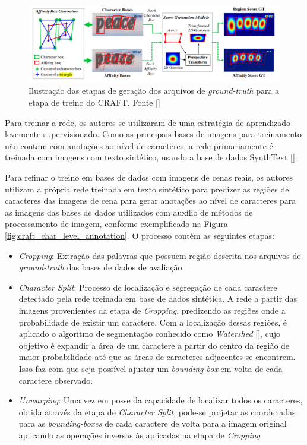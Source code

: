 \begin{figure}
    \centering
    \includegraphics[width=\textwidth]{figs/craft-gt.png}
    \caption{Ilustração das etapas de geração dos arquivos de \textit{ground-truth} para a etapa de treino do CRAFT. Fonte []}
    \label{fig:craft_gt}
\end{figure}

Para treinar a rede, os autores se utilizaram de uma estratégia de aprendizado levemente supervisionado. Como as principais bases de imagens para 
treinamento não contam com anotações ao nível de caracteres, a rede primariamente é treinada com imagens com texto sintético, usando a base de dados 
SynthText [].

Para refinar o treino em bases de dados com imagens de cenas reais, os autores utilizam a própria rede treinada em texto sintético para predizer 
as regiões de caracteres das imagens de cena para gerar anotações ao nível de caracteres para as imagens das bases de dados utilizados com auxílio 
de métodos de processamento de imagem, conforme exemplificado na Figura \ref{fig:craft_char_level_annotation}. O processo contém as seguintes etapas:

\begin{itemize}
    \item \textit{Cropping}: Extração das palavras que possuem região descrita nos arquivos de \textit{ground-truth} das bases de dados de avaliação.

    \item \textit{Character Split}: Processo de localização e segregação de cada caractere detectado pela rede treinada em base de dados sintética. 
    A rede a partir das imagens provenientes da etapa de \textit{Cropping}, predizendo as regiões onde a probabilidade de existir um caractere. 
    Com a localização dessas regiões, é aplicado o algoritmo de segmentação conhecido como \textit{Watershed} [], 
    cujo objetivo é expandir a área de um caractere a partir do centro da região de maior probabilidade até que as áreas de caracteres adjacentes se 
    encontrem. Isso faz com que seja possível ajustar um \textit{bounding-box} em volta de cada caractere observado.

    \item \textit{Unwarping}: Uma vez em posse da capacidade de localizar todos os caracteres, obtida através da etapa de \textit{Character Split}, 
    pode-se projetar as coordenadas para as \textit{bounding-boxes} de cada caractere de volta para a imagem original aplicando as operações inversas 
    às aplicadas na etapa de \textit{Cropping}
\end{itemize}

